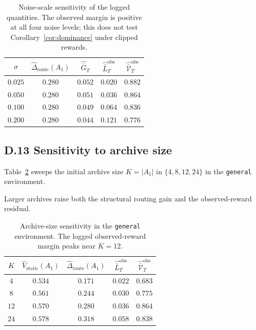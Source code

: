 \documentclass{article} %
\begin{document}
\begin{table}[h]
\centering
\small
\begin{tabular}{ccccc}
\toprule
$\sigma$ & $\widehat\Delta_{\mathrm{route}}(A_1)$ & $\widehat{\bar G}_T$ & $\widehat{\bar L}_T^{\mathrm{obs}}$ & $\widehat{\bar{\mathcal V}}_T^{\mathrm{obs}}$ \\
\midrule
$0.025$ & $0.280$ & $0.052$ & $0.020$ & $0.882$ \\
$0.050$ & $0.280$ & $0.051$ & $0.036$ & $0.864$ \\
$0.100$ & $0.280$ & $0.049$ & $0.064$ & $0.836$ \\
$0.200$ & $0.280$ & $0.044$ & $0.121$ & $0.776$ \\
\bottomrule
\end{tabular}
\caption{Noise-scale sensitivity of the logged quantities. The observed margin
is positive at all four noise levels; this does not test
Corollary~\ref{cor:dominance} under clipped rewards.}
\label{tab:app-sigma}
\end{table}

\subsection{D.13 Sensitivity to archive size}

\label{app:tab-K}

Table~\ref{tab:app-K} sweeps the initial archive size $K = |A_1|$ in $\{4,8,12,24\}$ in the \texttt{general} environment.

Larger archives raise both the structural routing gain and the
observed-reward residual.

\begin{table}[h]
\centering
\small
\begin{tabular}{ccccc}
\toprule
$K$ & $\widehat V_{\mathrm{static}}(A_1)$ & $\widehat\Delta_{\mathrm{route}}(A_1)$ & $\widehat{\bar L}_T^{\mathrm{obs}}$ & $\widehat{\bar{\mathcal V}}_T^{\mathrm{obs}}$ \\
\midrule
$4$  & $0.534$ & $0.171$ & $0.022$ & $0.683$ \\
$8$  & $0.561$ & $0.244$ & $0.030$ & $0.775$ \\
$12$ & $0.570$ & $0.280$ & $0.036$ & $0.864$ \\
$24$ & $0.578$ & $0.318$ & $0.058$ & $0.838$ \\
\bottomrule
\end{tabular}
\caption{Archive-size sensitivity in the \texttt{general} environment. The
logged observed-reward margin peaks near \(K=12\).}
\label{tab:app-K}
\end{table}
\end{document}
